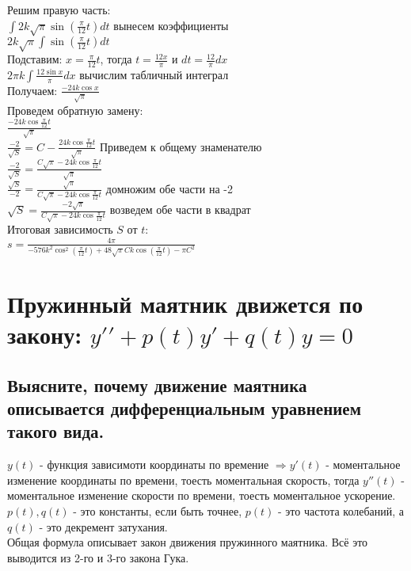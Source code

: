 \documentclass{article}
\begin{document}
    Решим правую часть: \\
    $\int 2  k  \sqrt{\pi}  \sin{(\frac{\pi}{12} t)}  dt$ вынесем коэффициенты \\
    $ 2  k  \sqrt{\pi} \int  \sin{(\frac{\pi}{12} t)}  dt$ \\
    Подставим: $x = \frac{\pi}{12} t$, тогда $t = \frac{12x}{\pi}$ и $dt = \frac{12}{\pi}dx$ \\
    $2 \pi k \int \frac{12 \sin{x}}{\pi} dx$ вычислим табличный интеграл \\
    Получаем: $ \frac{-24 k \cos{x}}{\sqrt{\pi}}$ \\
    Проведем обратную замену: \\
    $\frac{-24 k \cos{\frac{\pi}{12}t}}{\sqrt{\pi}}$\\
    $ \frac{-2}{\sqrt{S}} = C - \frac{24k \cos{\frac{\pi}{12}}t}{\sqrt{\pi}}$ Приведем к общему знаменателю\\
    $ \frac{-2}{\sqrt{S}} = \frac{C\sqrt{\pi} - 24k \cos{\frac{\pi}{12}}t}{\sqrt{\pi}}$ \\
    $ \frac{\sqrt{S}}{-2} = \frac{\sqrt{\pi}}{C\sqrt{\pi} - 24k \cos{\frac{\pi}{12}}t}$ домножим обе части на -2 \\
    $ \sqrt{S}= \frac{-2 \sqrt{\pi}}{C\sqrt{\pi} - 24k \cos{\frac{\pi}{12}}t}$ возведем обе части в квадрат\\ 
    Итоговая зависимость $S$ от $t$: \\
    $ s = \frac {4 \pi} { -576 k^2 \cos^2{(\frac{\pi}{12}t)} + 48 \sqrt{\pi} C k \cos{(\frac{\pi}{12}t)} - \pi C^2}$

\newpage
    \section{Пружинный маятник движется по закону: $y′′ + p(t)y′ + q(t)y = 0$}
    \subsection{Выясните, почему движение маятника описывается дифференциальным уравнением такого вида.}
    $y(t)$ - функция зависимоти координаты по времение $\Rightarrow y'(t)$ - моментальное изменение координаты по времени, тоесть моментальная скорость, тогда $y''(t)$ - моментальное изменение скорости по времени, тоесть моментальное ускорение.\\
    $p(t), q(t)$ - это константы, если быть точнее, $p(t)$ - это частота колебаний, а $q(t)$ - это декремент затухания.\\
    Общая формула описывает закон движения пружинного маятника. Всё это выводится из 2-го и 3-го закона Гука.
\end{document}
